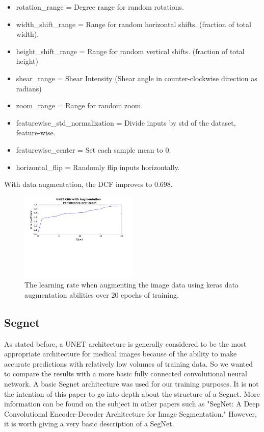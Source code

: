 \documentclass[letterpaper]{article}
\begin{document}
\begin{itemize}
  \item rotation\_range = Degree range for random rotations.
  \item width\_shift\_range =  Range for random horizontal shifts. (fraction of total width). 
  \item height\_shift\_range = Range for random vertical shifts. (fraction of total height)
  \item shear\_range = Shear Intensity (Shear angle in counter-clockwise direction as radians)
  \item zoom\_range = Range for random zoom.
  \item featurewise\_std\_normalization = Divide inputs by std of the dataset, feature-wise.
  \item featurewise\_center = Set each sample mean to 0.
  \item horizontal\_flip = Randomly flip inputs horizontally.
\end{itemize}

With data augmentation, the DCF improves to 0.698.

 \begin{figure}[H]
  \centerline{\includegraphics[width=0.5\textwidth]{Plots/UNETSimple20Augmented.png}}
  \caption{The learning rate when augmenting the image data using keras data augmentation abilities over 20 epochs of training.}
  \label{fig:unet3}
\end{figure}

\subsection{Segnet}
As stated before, a UNET architecture is generally considered to be the most appropriate architecture for medical images because of the ability to make accurate predictions with relatively low volumes of training data. So we wanted to compare the results with a more basic fully connected convolutional neural network. A basic Segnet architecture was used for our training purposes. It is not the intention of this paper to go into depth about the structure of a Segnet. More information can be found on the subject in other papers such as "SegNet: A Deep Convolutional Encoder-Decoder Architecture for Image Segmentation." \cite{badrinarayanan2015segnet} However, it is worth giving a very basic description of a SegNet. 
\end{document}

